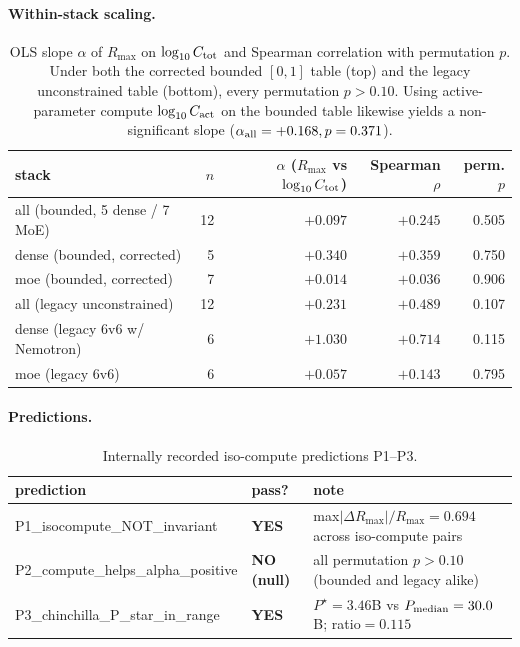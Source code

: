 \paragraph{Within-stack scaling.}
\begin{table}[ht]
\centering\small
\begin{tabular}{lrrrr}
\toprule
stack & $n$ & $\alpha$ ($R_{\max}$ vs $\log_{10} C_{\rm tot}$) & Spearman $\rho$ & perm. $p$ \\
\midrule
 all (bounded, 5 dense / 7 MoE) & 12 & $+0.097$ & $+0.245$ & 0.505 \\
 dense (bounded, corrected)     &  5 & $+0.340$ & $+0.359$ & 0.750 \\
 moe (bounded, corrected)       &  7 & $+0.014$ & $+0.036$ & 0.906 \\
\midrule
 all (legacy unconstrained)     & 12 & $+0.231$ & $+0.489$ & 0.107 \\
 dense (legacy 6v6 w/ Nemotron) &  6 & $+1.030$ & $+0.714$ & 0.115 \\
 moe (legacy 6v6)               &  6 & $+0.057$ & $+0.143$ & 0.795 \\
\bottomrule
\end{tabular}
\caption{OLS slope $\alpha$ of $R_{\max}$ on $\log_{10}C_{\rm tot}$ and Spearman correlation with permutation $p$. Under both the corrected bounded $[0,1]$ table (top) and the legacy unconstrained table (bottom), every permutation $p > 0.10$. Using active-parameter compute $\log_{10} C_{\rm act}$ on the bounded table likewise yields a non-significant slope ($\alpha_{\rm all} = +0.168, p = 0.371$).}
\label{tab:iter45-slopes}
\end{table}
\paragraph{Predictions.}
\begin{table}[ht]
\centering\small
\begin{tabular}{lll}
\toprule
prediction & pass? & note \\
\midrule
 P1\_isocompute\_NOT\_invariant & \textbf{YES} & max$|\Delta R_{\max}|/R_{\max} = 0.694$ across iso-compute pairs \\
 P2\_compute\_helps\_alpha\_positive & \textbf{NO (null)} & all permutation $p > 0.10$ (bounded and legacy alike) \\
 P3\_chinchilla\_P\_star\_in\_range & \textbf{YES} & $P^{\star}=3.46$B vs $P_{\rm median}=30.0$B; ratio$=0.115$ \\
\bottomrule
\end{tabular}
\caption{Internally recorded iso-compute predictions P1--P3.}
\end{table}

